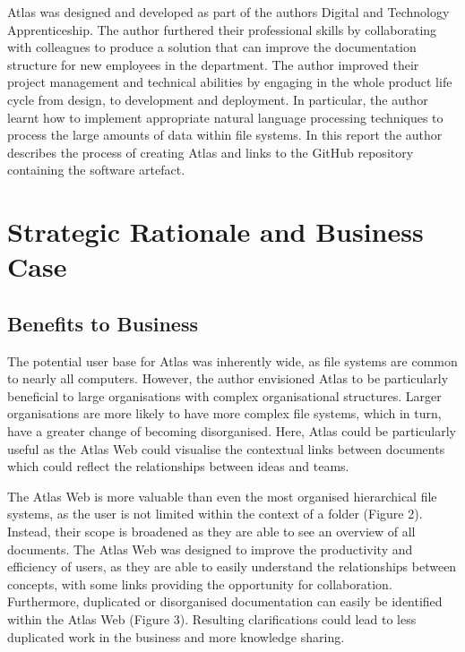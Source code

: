 \documentclass{article}
\begin{document}
Atlas was designed and developed as part of the authors Digital and Technology Apprenticeship. The author furthered their professional skills by collaborating with colleagues to produce a solution that can improve the documentation structure for new employees in the department. The author improved their project management and technical abilities by engaging in the whole product life cycle from design, to development and deployment. In particular, the author learnt how to implement appropriate natural language processing techniques to process the large amounts of data within file systems. In this report the author describes the process of creating Atlas and links to the GitHub repository containing the software artefact. 


\newpage

\section{Strategic Rationale and Business Case}

\subsection{Benefits to Business}
The potential user base for Atlas was inherently wide, as file systems are common to nearly all computers. However, the author envisioned Atlas to be particularly beneficial to large organisations with complex organisational structures. Larger organisations are more likely to have more complex file systems, which in turn, have a greater change of becoming disorganised. Here, Atlas could be particularly useful as the Atlas Web could visualise the contextual links between documents which could reflect the relationships between ideas and teams.

The Atlas Web is more valuable than even the most organised hierarchical file systems, as the user is not limited within the context of a folder (Figure 2). Instead, their scope is broadened as they are able to see an overview of all documents. The Atlas Web was designed to improve the productivity and efficiency of users, as they are able to easily understand the relationships between concepts, with some links providing the opportunity for collaboration. Furthermore, duplicated or disorganised documentation can easily be identified within the Atlas Web (Figure 3). Resulting clarifications could lead to less duplicated work in the business and more knowledge sharing.
\end{document}
